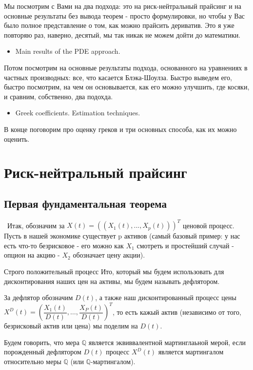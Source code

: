 \documentclass{article}
\begin{document}
Мы посмотрим с Вами на два подхода: это на риск-нейтральный прайсинг и на основные результаты без вывода теорем - просто формулировки, но чтобы у Вас было полное представление о том, как можно прайсить дериватив. Это я уже повторяю раз, наверно, десятый, мы так никак не можем дойти до математики. 
 \begin{itemize}
     \item Main results of the PDE approach.
 \end{itemize}

Потом посмотрим на основные результаты подхода, основанного на уравнениях в частных производных: все, что касается Блэка-Шоулза. Быстро выведем его, быстро посмотрим, на чем он основывается, как его можно улучшить, где косяки, и сравним, собственно, два подохда.
 \begin{itemize}
     \item Greek coefficients. Estimation techniques.
 \end{itemize}
 
 В конце поговорим про оценку греков и три основных способа, как их можно оценить.
 
\section{Риск-нейтральный прайсинг}
\subsection{Первая фундаментальная теорема}
~Итак, обозначим за \(X\left(t\right) = (\left(X_1(t), ..., X_p(t)\right))^T\) ценовой процесс. Пусть в нашей экономике существует p активов  (самый базовый пример: у нас есть что-то безрисковое - его можно как \(X_1\) смотреть и простейший случай - опцион на акцию - \(X_2\) обозначает цену акции).

Строго положительный процесс Ито, который мы будем использовать для дисконтирования наших цен на активы, мы будем называть дефлятором.

За дефлятор обозначим \(D\left(t\right)\), а также наш дисконтированный процесс цены
\(X^D\left(t\right) = \left(\dfrac{X_1\left(t\right)}{D\left(t\right)}, \ldots, \dfrac{X_P\left(t\right)}{D\left(t\right)}\right)^T\), то есть кажый актив (независимо от того, безрисковый актив или цена) мы поделим на \(D\left(t\right)\).

Будем говорить, что мера \(\mathbb{Q}\) является эквиввалентной мартинглаьной мерой, если порожденный дефлятором \(D\left(t\right)\) процесс \(X^D\left(t\right)\) является мартингалом относительно меры \(\mathbb{Q}\) (или \(\mathbb{Q}\)-мартингалом).
\end{document}
